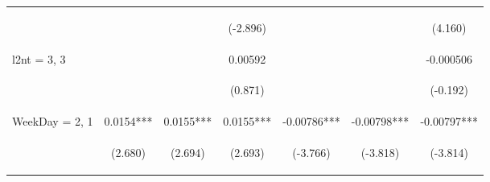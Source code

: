 \documentclass[]{standalone}
\begin{document}
\begin{tabular}{lcccccc}
    \vspace{4pt}     & \begin{footnotesize}\end{footnotesize}         & \begin{footnotesize}\end{footnotesize}         & \begin{footnotesize}(-2.896)\end{footnotesize} & \begin{footnotesize}\end{footnotesize}         & \begin{footnotesize}\end{footnotesize}         & \begin{footnotesize}(4.160)\end{footnotesize}  \\
    l2nt = 3, 3      &                                                &                                                & 0.00592                                        &                                                &                                                & -0.000506                                      \\
    \vspace{4pt}     & \begin{footnotesize}\end{footnotesize}         & \begin{footnotesize}\end{footnotesize}         & \begin{footnotesize}(0.871)\end{footnotesize}  & \begin{footnotesize}\end{footnotesize}         & \begin{footnotesize}\end{footnotesize}         & \begin{footnotesize}(-0.192)\end{footnotesize} \\
    WeekDay = 2, 1   & 0.0154***                                      & 0.0155***                                      & 0.0155***                                      & -0.00786***                                    & -0.00798***                                    & -0.00797***                                    \\
    \vspace{4pt}     & \begin{footnotesize}(2.680)\end{footnotesize}  & \begin{footnotesize}(2.694)\end{footnotesize}  & \begin{footnotesize}(2.693)\end{footnotesize}  & \begin{footnotesize}(-3.766)\end{footnotesize} & \begin{footnotesize}(-3.818)\end{footnotesize} & \begin{footnotesize}(-3.814)\end{footnotesize} \\

\end{tabular}
\end{document}
